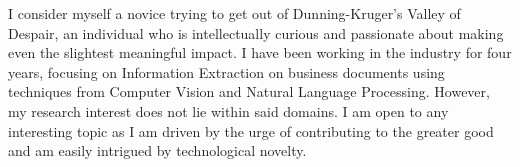 I consider myself a novice trying to get out of Dunning-Kruger's Valley of Despair, an individual who is intellectually curious and passionate about making even the slightest meaningful impact. I have been working in the industry for four years, focusing on Information Extraction on business documents using techniques from Computer Vision and Natural Language Processing. However, my research interest does not lie within said domains. I am open to any interesting topic as I am driven by the urge of contributing to the greater good and am easily intrigued by technological novelty.